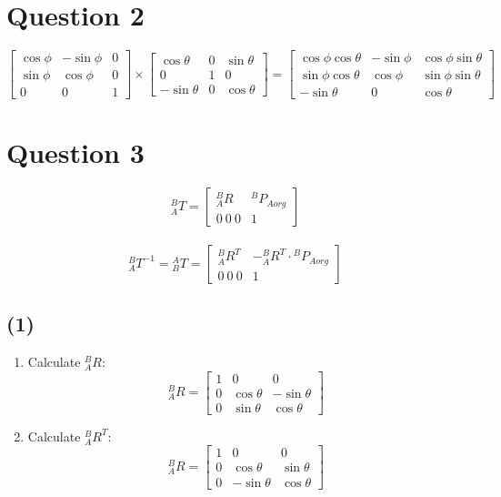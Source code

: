 \documentclass{article}
\begin{document}
\section*{Question 2}
\[
    \begin{bmatrix}
        \cos{\phi} & -\sin{\phi} & 0 \\
        \sin{\phi} & \cos{\phi} & 0 \\
        0 & 0 & 1
    \end{bmatrix}
    \times
    \begin{bmatrix}
        \cos{\theta} & 0 & \sin{\theta} \\
        0 & 1 & 0 \\
        -\sin{\theta} & 0 & \cos{\theta}
    \end{bmatrix}
    =
    \begin{bmatrix}
        \cos{\phi}\cos{\theta} & -\sin{\phi} & \cos{\phi}\sin{\theta} \\
        \sin{\phi}\cos{\theta} & \cos{\phi} & \sin{\phi}\sin{\theta} \\
        -\sin{\theta} & 0 & \cos{\theta}
    \end{bmatrix}
\]


\section*{Question 3} %
\[
    {}^{B}_{A}T = 
    \begin{bmatrix}
        {}^{B}_{A}R & {}^{B}_{}P_{Aorg} \\
        0 \ 0 \ 0 & 1
    \end{bmatrix}
\]
\\
\[
    {}^{B}_{A}T^{-1}
    =
    {}^{A}_{B}T
    =
    \begin{bmatrix}
        {}^{B}_{A}R^{T} & -{}^{B}_{A}R^{T} \cdot {}^{B}_{}P_{Aorg} \\
        0 \ 0 \ 0 & 1 
    \end{bmatrix}
\]
\subsection*{(1)}
\begin{enumerate}
    \item Calculate ${}^{B}_{A}R$:
    \[
        {}^{B}_{A}R = 
        \begin{bmatrix}
            1 & 0 & 0 \\
            0 & \cos{\theta} & -\sin{\theta} \\
            0 & \sin{\theta} & \cos{\theta}
        \end{bmatrix}
    \]
    \item Calculate ${}^{B}_{A}R^{T}$:
    \[
        {}^{B}_{A}R = 
        \begin{bmatrix}
           1 & 0 & 0 \\
           0 & \cos{\theta} & \sin{\theta} \\
           0 & -\sin{\theta} & \cos{\theta}
        \end{bmatrix}
    \]
\end{enumerate}
\end{document}
